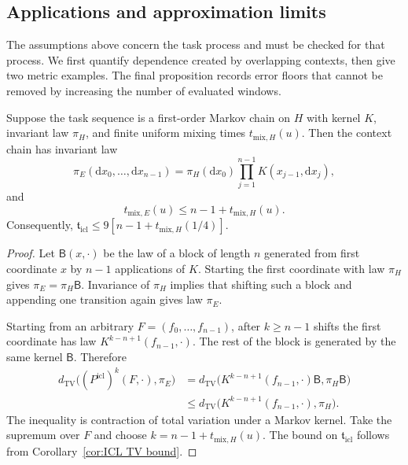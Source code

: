 \subsection{Applications and approximation limits}
\label{subsec:ICL applications}

The assumptions above concern the task process and must be checked for that process. We first quantify dependence created by overlapping contexts, then give two metric examples. The final proposition records error floors that cannot be removed by increasing the number of evaluated windows.

\begin{proposition}
\label{prop:ICL overlapping mixing}
Suppose the task sequence is a first-order Markov chain on \(H\) with kernel \(K\), invariant law \(\pi_H\), and finite uniform mixing times \(t_{\mathrm{mix},H}(u)\). Then the context chain has invariant law
\[
\pi_E(\mathrm dx_0,\ldots,\mathrm dx_{n-1})
=\pi_H(\mathrm dx_0)\prod_{j=1}^{n-1}K(x_{j-1},\mathrm dx_j),
\]
and
\begin{equation}
\label{eq:ICL overlapping mixing}
t_{\mathrm{mix},E}(u)\leqslant n-1+t_{\mathrm{mix},H}(u).
\end{equation}
Consequently, \(\mathfrak t_{\mathrm{icl}}\leqslant9[n-1+t_{\mathrm{mix},H}(1/4)]\).
\end{proposition}

\begin{proof}
Let \(\mathsf B(x,\cdot)\) be the law of a block of length \(n\) generated from first coordinate \(x\) by \(n-1\) applications of \(K\). Starting the first coordinate with law \(\pi_H\) gives \(\pi_E=\pi_H\mathsf B\). Invariance of \(\pi_H\) implies that shifting such a block and appending one transition again gives law \(\pi_E\).

Starting from an arbitrary \(F=(f_0,\ldots,f_{n-1})\), after \(k\geqslant n-1\) shifts the first coordinate has law \(K^{k-n+1}(f_{n-1},\cdot)\). The rest of the block is generated by the same kernel \(\mathsf B\). Therefore
\[
\begin{aligned}
d_{\mathrm{TV}}\bigl((P^{\mathrm{icl}})^k(F,\cdot),\pi_E\bigr)
&=d_{\mathrm{TV}}\bigl(K^{k-n+1}(f_{n-1},\cdot)\mathsf B,\pi_H\mathsf B\bigr)\\
&\leqslant d_{\mathrm{TV}}\bigl(K^{k-n+1}(f_{n-1},\cdot),\pi_H\bigr).
\end{aligned}
\]
The inequality is contraction of total variation under a Markov kernel. Take the supremum over \(F\) and choose \(k=n-1+t_{\mathrm{mix},H}(u)\). The bound on \(\mathfrak t_{\mathrm{icl}}\) follows from Corollary~\ref{cor:ICL TV bound}.
\end{proof}

